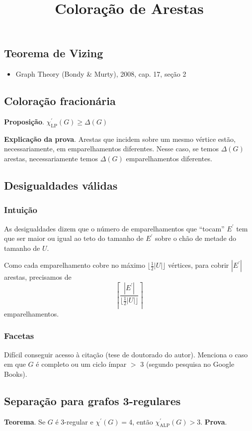 \documentclass[12pt]{article}
\title{Coloração de Arestas}
\begin{document}
    \subsection*{Teorema de Vizing}
    \begin{itemize}
        \item Graph Theory (Bondy \& Murty), 2008, cap. 17, seção 2 
    \end{itemize}

    \subsection*{Coloração fracionária}

        {\bf Proposição}. $\chi^\prime_\mathrm{LP}(G) \geq \Delta(G)$

        \vspace{0.5cm}
        {\bf Explicação da prova}. Arestas que incidem sobre um mesmo vértice estão, necessariamente, em emparelhamentos diferentes. Nesse caso, se temos $\Delta(G)$ arestas, necessariamente temos $\Delta(G)$ emparelhamentos diferentes.


    \subsection*{Desigualdades válidas}

    \subsubsection*{Intuição}
    As desigualdades dizem que o número de emparelhamentos que ``tocam'' $E^\prime$ tem que ser maior ou igual ao teto do tamanho de $E^\prime$ sobre o chão de metade do tamanho de $U$.

    Como cada emparelhamento cobre no máximo $\lfloor \frac{1}{2} |U| \rfloor$ vértices, para cobrir $|E^\prime|$ arestas, precisamos de $$\left\lceil \frac{|E^\prime|}{\lfloor \frac{1}{2} |U| \rfloor}\right\rceil$$
    emparelhamentos.

    \subsubsection*{Facetas}

    Difícil conseguir acesso à citação (tese de doutorado do autor). Menciona o caso em que $G$ é completo ou um ciclo ímpar $>$ 3 (segundo pesquisa no Google Books).

    \pagebreak
    \subsection*{Separação para grafos 3-regulares}
    {\bf Teorema}. Se $G$ é 3-regular e $\chi^\prime(G) = 4$, então $\chi^\prime_\mathrm{ALP}(G) > 3$.
    {\bf Prova}.
\end{document}
